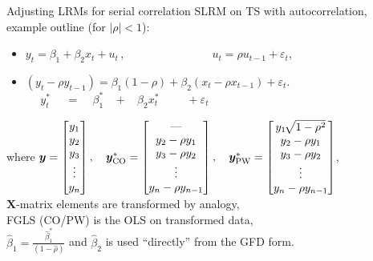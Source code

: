 \documentclass{beamer}
\begin{document}
\begin{frame}{Adjusting LRMs for serial correlation}
SLRM on TS with autocorrelation, example outline (for $|\rho|<1$):\\ \medskip
\begin{itemize}
    \item $y_t= \beta_1 + \beta_2 x_t + u_t \,,\qquad \qquad \qquad~~~~~~~\, u_t = \rho u_{t-1}+\varepsilon_t$,
    \smallskip
    \item $(y_t - \rho y_{t-1}) =  \beta_1 (1-\rho) + \beta_2 (x_t - \rho x_{t-1}) + \varepsilon_t$.\\
    $~~~~~~y_t^{*}~~~~~~=~~~~~\beta_1^{*} ~~~~+~~~~ \beta_2 x_t^{*}~~~~~~~~~~~ + \varepsilon_t $
\end{itemize}
\bigskip
where $ \bm{y} = \begin{bmatrix}
y_1\\ y_2\\ y_3\\ \vdots\\ y_n \end{bmatrix}, \quad 
\bm{y}^{*}_{\textnormal{CO}} = \begin{bmatrix}
\textnormal{---}\\ y_2-\rho y_1\\ y_3-\rho y_2 \\ \vdots \\ y_n-\rho y_{n-1} \end{bmatrix}, \quad \bm{y}^{*}_{\textnormal{PW}} = \begin{bmatrix}
y_{1\,}\sqrt[]{1-\rho^2}\\ y_2-\rho y_1\\ y_3-\rho y_2 \\ \vdots \\ y_n-\rho y_{n-1} \end{bmatrix}$,\\ \bigskip
$\bm{X}$-matrix elements are transformed by analogy, \\ \smallskip
FGLS (CO/PW) is the OLS on transformed data, \\ \medskip 
$\hat{\beta}_1 = \frac{\hat{\beta}_1^{*}}{(1-\hat{\rho})}$ and $\hat{\beta}_2$ is used ``directly'' from the GFD form.
\end{frame}
\end{document}
